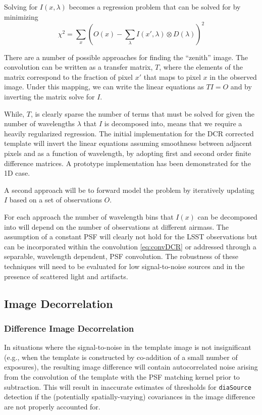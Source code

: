 Solving for $I(x,\lambda)$ becomes a regression problem that can be 
solved for by minimizing
\begin{equation}
\chi^2 = \sum_x (O(x) - \sum_\lambda I(x',\lambda) \otimes D(\lambda))^2 
\end{equation}

There are a number of possible approaches for finding the ``zenith''
image.  The convolution can be written as a transfer matrix, $T$,
where the elements of the matrix correspond to the fraction of pixel $x'$ that maps to pixel $x$ in the observed image. Under this mapping, we can write the linear equations as $TI=O$ and by inverting the matrix solve for $I$. 

While,  $T$, is clearly sparse the number of terms that must be solved for given the number of wavelengths $\lambda$ that $I$ is decomposed into, means that we require a heavily regularized regression. The initial implementation for the DCR corrected template will invert the linear equations assuming smoothness between adjacent pixels and as a function of wavelength, by adopting first and second
order finite difference matrices. %
A prototype implementation has been demonstrated for the 1D case.  

A second approach will be to forward model the problem by iteratively updating
$I$ based on a set of observations $O$.

For each approach the number of wavelength bins that $I(x)$ can be decomposed into will depend on the number of observations at different airmass. The assumption of a constant PSF will clearly not hold for the LSST observations but can be incorporated within the convolution \autoref{eq:convDCR} or addressed through a separable, wavelength dependent, PSF convolution. The robustness of these techniques will need to be evaluated for low signal-to-noise sources and in the presence of scattered light and artifacts. 

\subsection{Image Decorrelation}
\label{sec:acImageDecorrelation}
\subsubsection{Difference Image Decorrelation}
\label{sec:acDiffImDecorrelation}

In situations where the signal-to-noise in the template image is not insignificant (e.g., when the template is constructed by co-addition of a small number of exposures), the resulting image difference will contain autocorrelated noise arising from the convolution of the template with the PSF matching kernel prior to subtraction. This will result in inaccurate estimates of thresholds for {\tt diaSource} detection if the (potentially spatially-varying) covariances in the image difference are not properly accounted for.

